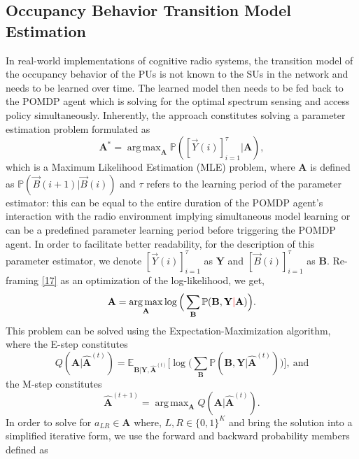 \documentclass[10pt,twocolumn]{IEEEtran}
\DeclareMathOperator*{\argmax}{arg\,max}
\newcommand{\add}[1]{{\color{red}{#1}}}
\begin{document}
\subsection{Occupancy Behavior Transition Model Estimation}
In real-world implementations of cognitive radio systems, the transition model of the occupancy behavior of the PUs is not known to the SUs in the network and needs to be learned over time. The learned model then needs to be fed back to the POMDP agent which is solving for the optimal spectrum sensing and access policy simultaneously. Inherently, the approach constitutes solving a parameter estimation problem formulated as
\begin{equation}\label{17}
    \mathbf{A}^{*} = \argmax_{\mathbf{A}} \mathbb{P}([\vec{Y}(i)]_{i=1}^{\tau}|\mathbf{A}),
\end{equation}
which is a Maximum Likelihood Estimation (MLE) problem, where $\mathbf{A}$ is defined as $\mathbb{P}(\vec{B}(i+1)|\vec{B}(i))$ and $\tau$ refers to the learning period of the parameter estimator: this can be equal to the entire duration of the POMDP agent's interaction with the radio environment implying simultaneous model learning or can be a predefined parameter learning period before triggering the POMDP agent. In order to facilitate better readability, for the description of this parameter estimator, we denote $[\vec{Y}(i)]_{i=1}^{\tau}$ as $\mathbf{Y}$ and $[\vec{B}(i)]_{i=1}^{\tau}$ as $\mathbf{B}$. Re-framing \eqref{17} as an optimization of the log-likelihood, we get,
\begin{equation}\label{18}
    \mathbf{A} = \argmax_{\mathbf{A}} \log\Big(\sum_{\mathbf{B}} \mathbb{P}(\mathbf{B}, \mathbf{Y}\add{|} \mathbf{A})\Big).
\end{equation}
This problem can be solved using the Expectation-Maximization algorithm, where the E-step constitutes
\begin{equation}
    Q(\mathbf{A}|\hat{\mathbf{A}}^{(t)}) = \mathbb{E}_{\mathbf{B}|\mathbf{Y}, \hat{\mathbf{A}}^{(t)}} \Big[ \log \Big(\sum_{\mathbf{B}} \mathbb{P}(\mathbf{B}, \mathbf{Y}|\hat{\mathbf{A}}^{(t)}) \Big) \Big],\ \text{and}
\end{equation}
the M-step constitutes
\begin{equation}
    \hat{\mathbf{A}}^{(t+1)} = \argmax_{\mathbf{A}} Q(\mathbf{A}|\hat{\mathbf{A}}^{(t)}).
\end{equation}
In order to solve for $a_{LR} {\in} \mathbf{A}$ where, $L, R {\in} \{0, 1\}^{K}$ and bring the solution into a simplified iterative form, we use the forward and backward probability members defined as
\end{document}
